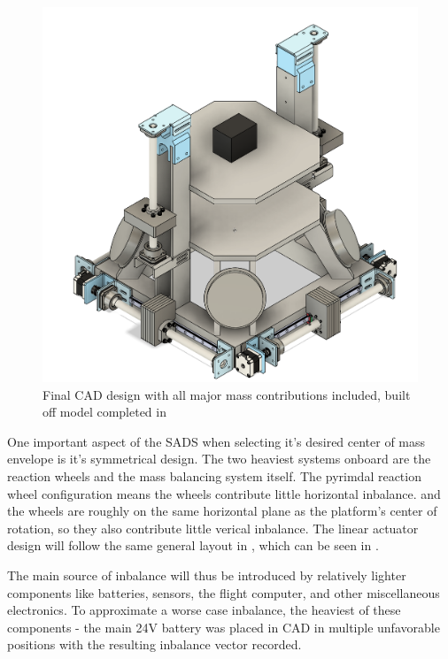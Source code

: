 \begin{figure}[h]\label{fig:full_CAD}
    \centering
    \includegraphics[width=0.95\linewidth]{figures/full_CAD.png}
    \caption{Final CAD design with all major mass contributions included, built off model completed in~\cite{gilman_automatic_2024}}

\end{figure}


One important aspect of the SADS when selecting it's desired center of mass envelope is it's symmetrical design. The two heaviest systems onboard are the reaction wheels and the mass balancing system itself. The pyrimdal reaction wheel configuration means the wheels contribute little horizontal inbalance. and the wheels are roughly on the same horizontal plane as the platform's center of rotation, so they also contribute little verical inbalance. The linear actuator design will follow the same general layout in \cite{gilman_automatic_2024}, which can be seen in . 

The main source of inbalance will thus be introduced by relatively lighter components like batteries, sensors, the flight computer, and other miscellaneous electronics. To approximate a worse case inbalance, the heaviest of these components - the main 24V battery was placed in CAD in multiple unfavorable positions with the resulting inbalance vector recorded. 

